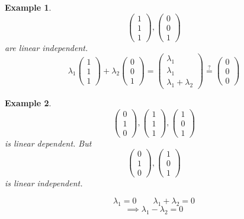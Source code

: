 \documentclass[a4paper,landscape,twocolumn]{article}
\newtheorem{ex}{Example}[section]
\begin{document}
\begin{ex}
  \[ \begin{pmatrix} 1 \\ 1 \\ 1 \end{pmatrix}, \begin{pmatrix} 0 \\ 0 \\ 1 \end{pmatrix} \]
  are linear independent.
  \[ \lambda_1 \begin{pmatrix} 1 \\ 1 \\ 1 \end{pmatrix} + \lambda_2 \begin{pmatrix} 0 \\ 0 \\ 1 \end{pmatrix} = \begin{pmatrix} \lambda_1 \\ \lambda_1 \\ \lambda_1 + \lambda_2 \end{pmatrix} \stackrel?= \begin{pmatrix} 0 \\ 0 \\ 0 \end{pmatrix} \]
\end{ex}

\begin{ex}
  \[ \begin{pmatrix} 0 \\ 1 \\ 0 \end{pmatrix}, \begin{pmatrix} 1 \\ 1 \\ 1 \end{pmatrix}, \begin{pmatrix} 1 \\ 0 \\ 1 \end{pmatrix} \]
  is linear dependent. But
  \[ \begin{pmatrix} 0 \\ 1 \\ 0 \end{pmatrix}, \begin{pmatrix} 1 \\ 0 \\ 1 \end{pmatrix} \]
  is linear independent.

  \[ \lambda_1 = 0 \qquad \lambda_1 + \lambda_2 = 0 \]
  \[ \implies \lambda_1 - \lambda_2 = 0 \]
\end{ex}
\end{document}
